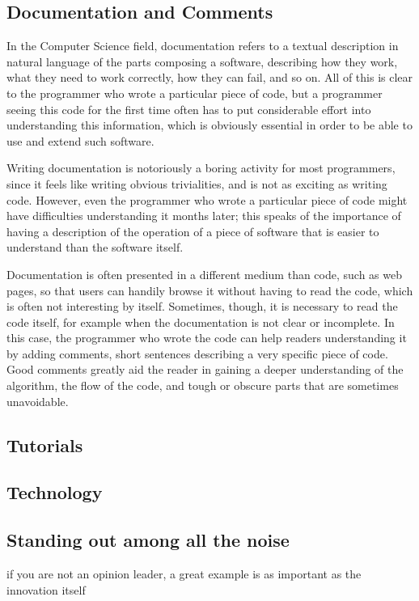 \documentclass[12pt]{article}
\begin{document}
\subsection{Documentation and Comments}
\label{sec:org9be947e}
In the Computer Science field, documentation refers to a textual description in natural language of the parts composing a software, describing how they work, what they need to work correctly, how they can fail, and so on. All of this is clear to the programmer who wrote a particular piece of code, but a programmer seeing this code for the first time often has to put considerable effort into understanding this information, which is obviously essential in order to be able to use and extend such software.

Writing documentation is notoriously a boring activity for most programmers, since it feels like writing obvious trivialities, and is not as exciting as writing code. However, even the programmer who wrote a particular piece of code might have difficulties understanding it months later; this speaks of the importance of having a description of the operation of a piece of software that is easier to understand than the software itself.

Documentation is often presented in a different medium than code, such as web pages, so that users can handily browse it without having to read the code, which is often not interesting by itself. Sometimes, though, it is necessary to read the code itself, for example when the documentation is not clear or incomplete. In this case, the programmer who wrote the code can help readers understanding it by adding comments, short sentences describing a very specific piece of code. Good comments greatly aid the reader in gaining a deeper understanding of the algorithm, the flow of the code, and tough or obscure parts that are sometimes unavoidable.

\subsection{Tutorials}
\label{sec:org155399a}

\subsection{Technology}
\label{sec:org96ba8a1}

\subsection{Standing out among all the noise}
\label{sec:orgcf06e41}
if you are not an opinion leader, a great example is as important as the innovation itself
\end{document}
